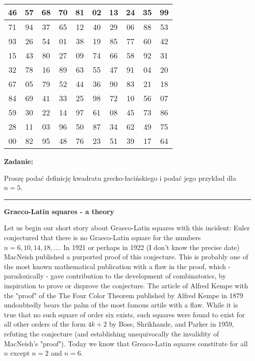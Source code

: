 \documentclass[12pt]{article} %
\begin{document}
\begin{tabular}{| c | c | c | c | c | c | c | c | c | c | }
\hline
 46  & 57 & 68 & 70 & 81 & 02 & 13 & 24 & 35 & 99  \\
\hline
 71  & 94 & 37 & 65 & 12 & 40 & 29 & 06 & 88 & 53  \\
\hline
 93  & 26 & 54 & 01 & 38 & 19 & 85 & 77 & 60 & 42  \\
\hline
 15 & 43 & 80 & 27 & 09 & 74 & 66 & 58 & 92 & 31  \\
\hline
 32 & 78 & 16 & 89 & 63 & 55 & 47 & 91 & 04 & 20  \\
\hline
 67  & 05 & 79 & 52 & 44 & 36 & 90 & 83 & 21 & 18  \\
\hline
 84  & 69 & 41 & 33 & 25 & 98 & 72 & 10 & 56 & 07  \\
\hline
  59 & 30 & 22 & 14 & 97 & 61 & 08 & 45 & 73 & 86  \\
\hline
  28 & 11 & 03 & 96 & 50 & 87 & 34 & 62 & 49 & 75  \\
\hline
  00 & 82 & 95 & 48 & 76 & 23 & 51 & 39 & 17 & 64  \\
\hline
\end{tabular}

{\bf Zadanie:}

Proszę podać definicję kwadratu grecko-łacińskiego i podać
jego przykład dla $n=5$.


\medskip 
\hrule
\medskip


\begin{flushleft}{\bf Graeco-Latin squares - a theory}
\end{flushleft}

  Let us begin our short story about Graeco-Latin squares
with this incident: Euler conjectured that there is no Graeco-Latin square 
for the numbers $n = 6, 10, 14, 18, \ldots$.
 In 1921 or perhaps in 1922 (I don't know the precise date) 
MacNeish published a purported proof of this conjecture. 
  This is probably one of the most known
mathematical publication with a flaw in the proof, which - paradoxically - gave
contribution to the development of combinatorics, by inspiration
to prove or disprove the conjecture. 
The article of Alfred Kempe with the "proof" of the The Four Color Theorem
published by Alfred Kempe in 1879 undoubtedly bears the palm
of the most famous artile with a flaw.
  While it is true that no such square of order six exists, such squares were found to exist for all other orders of the form $4k + 2$ by Bose, Shrikhande, and Parker in 1959, refuting the conjecture 
(and establishing unequivocally the invalidity of MacNeish's "proof").
  Today we know that Greaco-Latin squares constitute
for all $n$ except $n = 2$ and $n = 6$.
\end{document}
